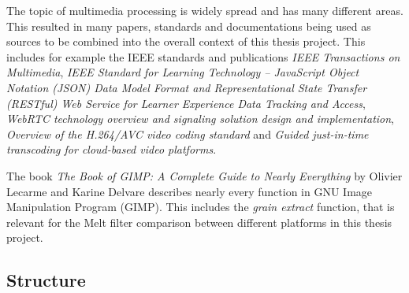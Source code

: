 \documentclass[../MasterThesis.tex]{subfiles}
\begin{document}
\begin{description}[font=\color{RedViolet!80!black}, style=nextline]
		The topic of multimedia processing is widely spread and has many different areas. This resulted in many papers, standards and documentations being used as sources to be combined into the overall context of this thesis project. This includes for example the IEEE standards and publications \textit{IEEE Transactions on Multimedia}, \textit{IEEE Standard for Learning Technology -- JavaScript Object Notation (JSON) Data Model Format and Representational State Transfer (RESTful) Web Service for Learner Experience Data Tracking and Access}, \textit{WebRTC technology overview and signaling solution design and implementation}, \textit{Overview of the H.264/AVC video coding standard} and \textit{Guided just-in-time transcoding for cloud-based video platforms}.~\cite{transcoding, IEEE_Rest, webrtc, h264, JIT_IEEE}
		
		
		
		
		
		
		
		
		
		
		\newpage
		
		\item[GIMP]
		
		
		The book \textit{The Book of GIMP: A Complete Guide to Nearly Everything} by Olivier Lecarme and Karine Delvare describes nearly every function in GNU Image Manipulation Program (GIMP). This includes the \textit{grain extract} function, that is relevant for the Melt filter comparison between different platforms in this thesis project.~\cite{gimp}
		
		
		
		
		
		
	\end{description}
	
	
	
	
	
	
	
	
	
	\subsection{Structure} \label{subsection:structure}
	
\end{document}
